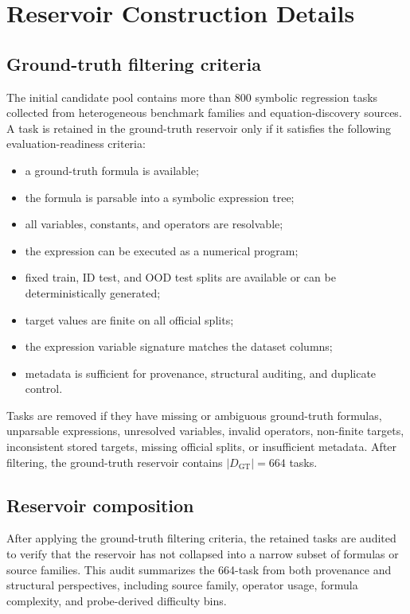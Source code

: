\section{Reservoir Construction Details}
\label{app:reservoir}

\subsection{Ground-truth filtering criteria}

The initial candidate pool contains more than 800 symbolic regression tasks collected from heterogeneous benchmark families and equation-discovery sources. A task is retained in the ground-truth reservoir only if it satisfies the following evaluation-readiness criteria:
\begin{itemize}
    \item a ground-truth formula is available;
    \item the formula is parsable into a symbolic expression tree;
    \item all variables, constants, and operators are resolvable;
    \item the expression can be executed as a numerical program;
    \item fixed train, ID test, and OOD test splits are available or can be deterministically generated;
    \item target values are finite on all official splits;
    \item the expression variable signature matches the dataset columns;
    \item metadata is sufficient for provenance, structural auditing, and duplicate control.
\end{itemize}

Tasks are removed if they have missing or ambiguous ground-truth formulas, unparsable expressions, unresolved variables, invalid operators, non-finite targets, inconsistent stored targets, missing official splits, or insufficient metadata. After filtering, the ground-truth reservoir contains $|D_{\mathrm{GT}}| = 664$ tasks.

\subsection{Reservoir composition}

After applying the ground-truth filtering criteria, the retained tasks are audited to verify that the reservoir has not collapsed into a narrow subset of formulas or source families. This audit summarizes the 664-task \reservoir{} from both provenance and structural perspectives, including source family, operator usage, formula complexity, and probe-derived difficulty bins.

